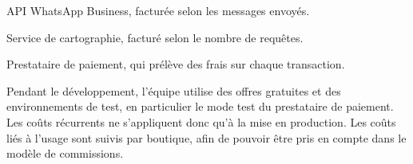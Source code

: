 \begin{cdcitems}
  \item API WhatsApp Business, facturée selon les messages envoyés.
  \item Service de cartographie, facturé selon le nombre de requêtes.
  \item Prestataire de paiement, qui prélève des frais sur chaque transaction.
\end{cdcitems}


Pendant le développement, l’équipe utilise des offres gratuites et des environnements de test, en particulier le mode test du prestataire de paiement. Les coûts récurrents ne s’appliquent donc qu’à la mise en production. Les coûts liés à l’usage sont suivis par boutique, afin de pouvoir être pris en compte dans le modèle de commissions.
